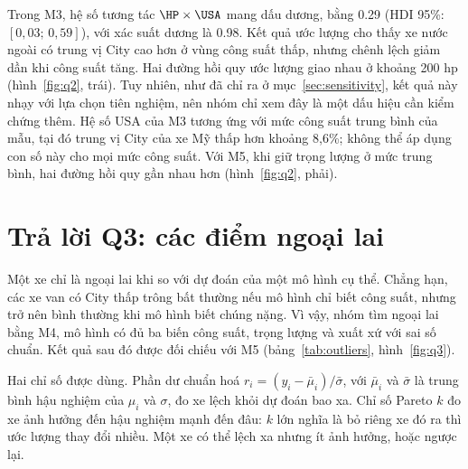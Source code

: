 \documentclass[12pt,a4paper]{report}
\begin{document}
Trong M3, hệ số tương tác $\HP \times \USA$ mang dấu dương, bằng \num{0.29} (HDI
95\%: $[0{,}03;\, 0{,}59]$), với xác suất dương là \num{0.98}. Kết quả ước lượng
cho thấy xe nước ngoài có trung vị City cao hơn ở vùng công suất thấp,
nhưng chênh lệch giảm dần khi công suất tăng. Hai đường hồi quy ước lượng giao
nhau ở khoảng 200 hp
(hình~\ref{fig:q2}, trái). Tuy nhiên, như đã chỉ ra ở mục~\ref{sec:sensitivity},
kết quả này nhạy với lựa chọn tiên nghiệm, nên nhóm chỉ xem đây là một dấu hiệu
cần kiểm chứng thêm. Hệ số USA của M3 tương ứng với mức công suất trung bình
của mẫu, tại đó trung vị City của xe Mỹ thấp hơn khoảng 8{,}6\%; không thể áp
dụng con số này cho mọi mức công suất. Với M5, khi giữ trọng lượng ở mức trung
bình, hai đường hồi quy gần nhau hơn (hình~\ref{fig:q2}, phải).


\section{Trả lời Q3: các điểm ngoại lai}
\label{sec:q3}

Một xe chỉ là ngoại lai khi so với dự đoán của một mô hình cụ thể. Chẳng hạn,
các xe van có City thấp trông bất thường nếu mô hình chỉ biết công suất, nhưng
trở nên bình thường khi mô hình biết chúng nặng. Vì vậy, nhóm tìm ngoại lai bằng
M4, mô hình có đủ ba biến công suất, trọng lượng và xuất xứ với sai số chuẩn.
Kết quả sau đó được đối chiếu với M5 (bảng~\ref{tab:outliers},
hình~\ref{fig:q3}).

Hai chỉ số được dùng. Phần dư chuẩn hoá $r_i = (y_i - \bar{\mu}_i)/\bar{\sigma}$,
với $\bar{\mu}_i$ và $\bar{\sigma}$ là trung bình hậu nghiệm của $\mu_i$ và
$\sigma$, đo xe lệch khỏi dự đoán bao xa. Chỉ số Pareto $k$ đo xe ảnh hưởng đến
hậu nghiệm mạnh đến đâu: $k$ lớn nghĩa là bỏ riêng xe đó ra thì ước lượng thay
đổi nhiều. Một xe có thể lệch xa nhưng ít ảnh hưởng, hoặc ngược lại.
\end{document}
